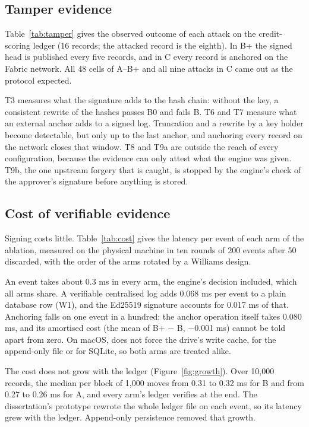 \subsection{Tamper evidence}

Table~\ref{tab:tamper} gives the observed outcome of each attack on the credit-scoring ledger (16 records; the attacked record is the eighth). In B+ the signed head is published every five records, and in C every record is anchored on the Fabric network. All 48 cells of A--B+ and all nine attacks in C came out as the protocol expected.




T3 measures what the signature adds to the hash chain: without the key, a consistent rewrite of the hashes passes B0 and fails B. T6 and T7 measure what an external anchor adds to a signed log. Truncation and a rewrite by a key holder become detectable, but only up to the last anchor, and anchoring every record on the network closes that window. T8 and T9a are outside the reach of every configuration, because the evidence can only attest what the engine was given. T9b, the one upstream forgery that is caught, is stopped by the engine's check of the approver's signature before anything is stored.

\subsection{Cost of verifiable evidence}

Signing costs little. Table~\ref{tab:cost} gives the latency per event of each arm of the ablation, measured on the physical machine in ten rounds of 200 events after 50 discarded, with the order of the arms rotated by a Williams design.



An event takes about 0.3 ms in every arm, the engine's decision included, which all arms share. A verifiable centralised log adds 0.068 ms per event to a plain database row (W1), and the Ed25519 signature accounts for 0.017 ms of that. Anchoring falls on one event in a hundred: the anchor operation itself takes 0.080 ms, and its amortised cost (the mean of B+ $-$ B, $-$0.001 ms) cannot be told apart from zero. On macOS,  does not force the drive's write cache, for the append-only file or for SQLite, so both arms are treated alike.

The cost does not grow with the ledger (Figure~\ref{fig:growth}). Over 10,000 records, the median per block of 1,000 moves from 0.31 to 0.32 ms for B and from 0.27 to 0.26 ms for A, and every arm's ledger verifies at the end. The dissertation's prototype rewrote the whole ledger file on each event, so its latency grew with the ledger. Append-only persistence removed that growth.


